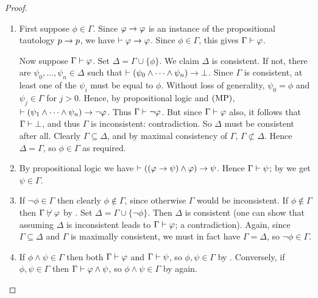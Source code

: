 \begin{proof}\leavevmode
    \begin{enumerate}

        \item First suppose $\phi \in \Gamma$. Since $\varphi \to \varphi$ is
              an instance of the propositional tautology $p \to p$, we
              have $\vdash \varphi \to \varphi$. Since $\phi \in \Gamma$, this
              gives $\Gamma \vdash \varphi$.

              Now suppose $\Gamma \vdash \varphi$. Set $\Delta = \Gamma \cup
              \{\phi\}$. We claim $\Delta$ is consistent. If not, there are
              $\psi_0,\ldots,\psi_n \in \Delta$ such that $\vdash (\psi_0 \land
              \cdots \land \psi_n) \to \bot$. Since $\Gamma$ is
              consistent, at least one of the $\psi_i$ must be equal to $\phi$.
              Without loss of generality, $\psi_0 = \phi$ and $\psi_j \in
              \Gamma$ for $j > 0$. Hence, by propositional logic and $(\text{MP})$,
              $\vdash (\psi_1 \land \cdots \land \psi_n) \to \neg \varphi$.
              Thus $\Gamma \vdash \neg\varphi$.  But since $\Gamma \vdash
              \varphi$ also, it follows that $\Gamma \vdash \bot$, and thus
              $\Gamma$ is inconsistent: contradiction. So $\Delta$ must be
              consistent after all. Clearly $\Gamma \subseteq \Delta$, and by
              maximal consistency of $\Gamma$, $\Gamma \not\subset \Delta$.
              Hence $\Delta = \Gamma$, so $\phi \in \Gamma$ as required.

        \item By propositional logic we have $\vdash ((\varphi \to \psi) \land
              \varphi) \to \psi$. Hence $\Gamma \vdash \psi$; by
               we get $\psi \in \Gamma$.

        \item If $\neg\phi \in \Gamma$ then clearly $\phi \notin \Gamma$, since
              otherwise $\Gamma$ would be inconsistent. If $\phi \notin \Gamma$
              then $\Gamma \not\vdash \varphi$ by .
              Set $\Delta = \Gamma \cup \{\neg\phi\}$. Then $\Delta$ is
              consistent (one can show that assuming $\Delta$ is inconsistent
              leads to $\Gamma \vdash \varphi$; a contradiction). Again, since
              $\Gamma \subseteq \Delta$ and $\Gamma$ is maximally consistent,
              we must in fact have $\Gamma = \Delta$, so $\neg\phi \in \Gamma$.

        \item If $\phi \land \psi \in \Gamma$ then both $\Gamma \vdash \varphi$
              and $\Gamma \vdash \psi$, so $\phi, \psi \in \Gamma$ by
              .  Conversely, if $\phi, \psi \in
              \Gamma$ then $\Gamma \vdash \varphi \land \psi$, so $\phi \land
              \psi \in \Gamma$ by  again.

    \end{enumerate}
\end{proof}


